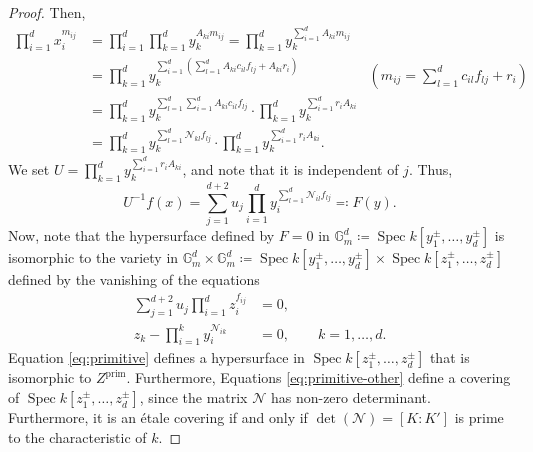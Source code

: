 \documentclass[11pt, reqno]{amsart}
\theoremstyle{plain}
\theoremstyle{definition}
\newcommand{\G}{\mathbb{G}}
\newcommand{\Spec}{\operatorname{Spec}}
\begin{document}
\begin{proof}
\allowdisplaybreaks
Then,
\begin{align*}
\prod_{i=1}^d x_i^{m_{ij}} &= \prod_{i=1}^d \prod_{k=1}^d y_k^{A_{ki}m_{ij}} =\prod_{k=1}^d y_k^{\sum_{i=1}^d A_{ki} m_{ij}}\\
&=\prod_{k=1}^d y_k^{\sum_{i=1}^d \left(\sum_{l=1}^d A_{ki}c_{il} f_{lj} +A_{ki}r_i \right) }   &(m_{ij} = \sum_{l=1}^d c_{il} f_{lj} +r_i )\\
&=  \prod_{k=1}^d y_k^{\sum_{l=1}^d\sum_{i=1}^dA_{ki} c_{il} f_{lj} } \cdot\prod_{k=1}^d y_k^{\sum_{i=1}^d r_i A_{ki}} \\
&= \prod_{k=1}^d y_k^{\sum_{l=1}^d \mathcal{N}_{kl} f_{lj}}\cdot\prod_{k=1}^d y_k^{\sum_{i=1}^d r_i A_{ki}} .
\end{align*}
\endgroup
We set $U = \prod_{k=1}^d y_k^{\sum_{i=1}^d r_i A_{ki}}$, and note that it is independent of $j$. Thus,
\[
U^{-1}f(x) = \sum_{j=1}^{d+2} u_j \prod_{i=1}^d  y_i ^{\sum_{l=1}^d \mathcal{N}_{il}f_{lj}} \eqqcolon F(y).
\]
Now, note that the hypersurface defined by $F=0 $ in $\G_m^{d} \coloneqq \Spec k[y_1^\pm,\dots, y_d^\pm]$ is isomorphic to the variety in $\G_m^d \times \G_m^d \coloneqq \Spec k[y_1^\pm,\dots, y_d^\pm] \times \Spec k[z_1^\pm,\dots, z_d^\pm]$ defined by the vanishing of the equations
\begin{align}
    \sum_{j=1}^{d+2} u_j \prod_{i=1}^d z_i^{f_{ij}}&=0 \label{eq:primitive},\\
     z_k -\prod_{i=1}^k y_i^{\mathcal{N}_{ik}}  &= 0,\qquad    k=1,\dots,d.\label{eq:primitive-other}
\end{align}
Equation \eqref{eq:primitive} defines a hypersurface in $\Spec k[z_1^\pm,\dots, z_d^\pm]$ that is isomorphic to $Z^{\mathrm{prim}}$. Furthermore, Equations \eqref{eq:primitive-other} define a covering of $\Spec k[z_1^\pm,\dots, z_d^\pm]$, since the matrix $\mathcal{N}$ has non-zero determinant. Furthermore, it is an étale covering if and only if $\det(\mathcal{N})=[K:K']$ is prime to the characteristic of $k$.
\end{proof}
\end{document}
